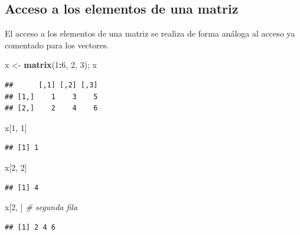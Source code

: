 \documentclass[]{book}
\newenvironment{Shaded}{\begin{snugshade}}{\end{snugshade}}
\newcommand{\KeywordTok}[1]{\textcolor[rgb]{0.13,0.29,0.53}{\textbf{#1}}}
\newcommand{\DecValTok}[1]{\textcolor[rgb]{0.00,0.00,0.81}{#1}}
\newcommand{\StringTok}[1]{\textcolor[rgb]{0.31,0.60,0.02}{#1}}
\newcommand{\CommentTok}[1]{\textcolor[rgb]{0.56,0.35,0.01}{\textit{#1}}}
\newcommand{\OperatorTok}[1]{\textcolor[rgb]{0.81,0.36,0.00}{\textbf{#1}}}
\newcommand{\NormalTok}[1]{#1}
\begin{document}
\subsection{Acceso a los elementos de una
matriz}\label{acceso-a-los-elementos-de-una-matriz}

El acceso a los elementos de una matriz se realiza de forma análoga al
acceso ya comentado para los vectores.

\begin{Shaded}
\begin{Highlighting}[]
\NormalTok{x <-}\StringTok{ }\KeywordTok{matrix}\NormalTok{(}\DecValTok{1}\OperatorTok{:}\DecValTok{6}\NormalTok{, }\DecValTok{2}\NormalTok{, }\DecValTok{3}\NormalTok{); x}
\end{Highlighting}
\end{Shaded}

\begin{verbatim}
##      [,1] [,2] [,3]
## [1,]    1    3    5
## [2,]    2    4    6
\end{verbatim}

\begin{Shaded}
\begin{Highlighting}[]
\NormalTok{x[}\DecValTok{1}\NormalTok{, }\DecValTok{1}\NormalTok{]}
\end{Highlighting}
\end{Shaded}

\begin{verbatim}
## [1] 1
\end{verbatim}

\begin{Shaded}
\begin{Highlighting}[]
\NormalTok{x[}\DecValTok{2}\NormalTok{, }\DecValTok{2}\NormalTok{]}
\end{Highlighting}
\end{Shaded}

\begin{verbatim}
## [1] 4
\end{verbatim}

\begin{Shaded}
\begin{Highlighting}[]
\NormalTok{x[}\DecValTok{2}\NormalTok{, ]  }\CommentTok{# segunda fila}
\end{Highlighting}
\end{Shaded}

\begin{verbatim}
## [1] 2 4 6
\end{verbatim}
\end{document}
